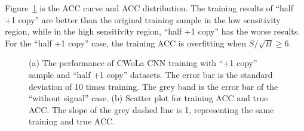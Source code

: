 \documentclass[12pt]{article}
\begin{document}
			Figure~\ref{fig:cwola_cnn_training_performance_half_copy_1} is the ACC curve and ACC distribution. The training results of ``half +1 copy'' are better than the original training sample in the low sensitivity region, while in the high sensitivity region, ``half +1 copy'' has the worse results. For the ``half +1 copy'' case, the training ACC is overfitting when $S / \sqrt{B} \ge 6$.
			\begin{figure}[htpb]
				\centering
				\caption{(a) The performance of CWoLa CNN training with ``+1 copy'' sample and ``half +1 copy'' datasets. The error bar is the standard deviation of 10 times training. The grey band is the error bar of the ``without signal'' case. (b) Scatter plot for training ACC and true ACC. The slope of the grey dashed line is 1, representing the same training and true ACC.}
				\label{fig:cwola_cnn_training_performance_half_copy_1}
			\end{figure}
\end{document}
